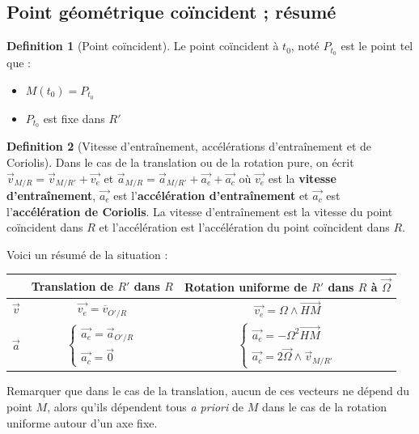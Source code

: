 \documentclass[french]{book}
\theoremstyle{plain}
\theoremstyle{definition}
\newtheorem{dfn}{Definition}
\theoremstyle{remark}
\begin{document}
\subsection{Point géométrique coïncident ; résumé}
\begin{dfn}[Point coïncident]
	Le point coïncident à $t_0$, noté $P_{t_0}$ est le point tel que : \begin{itemize}
		\item $M(t_0)=P_{t_0}$
		\item $P_{t_0}$ est fixe dans $R'$
	\end{itemize}
\end{dfn}
\begin{dfn}[Vitesse d'entraînement, accélérations d'entraînement et de Coriolis]
	Dans le cas de la translation ou de la rotation pure, on écrit $\overrightarrow{v}_{M/R}=\overrightarrow{v}_{M/R'}+\overrightarrow{v_e}$ et $\overrightarrow{a}_{M/R}=\overrightarrow{a}_{M/R'}+\overrightarrow{a_e}+\overrightarrow{a_c}$ où $\overrightarrow{v_e}$ est la \textbf{vitesse d'entraînement}, $\overrightarrow{a_e}$ est l'\textbf{accélération d'entraînement} et $\overrightarrow{a_c}$ est l'\textbf{accélération de Coriolis}. La vitesse d'entraînement est la vitesse du point coïncident dans $R$ et l'accélération est l'accélération du point coïncident dans $R$.
\end{dfn}
Voici un résumé de la situation : 
\begin{center}
	\begin{tabular}{|c|c|c|}
		\hline
		&Translation de $R'$ dans $R$&Rotation uniforme de $R'$ dans $R$ à $\overrightarrow{\Omega}$ \\[3mm]
		\hline
		$\overrightarrow{v}$&$\overrightarrow{v_e}=\overline{v}_{O'/R}$&$\overrightarrow{v_e}=\Omega\wedge\overrightarrow{HM}$ \\[3mm]
		\hline
		$\overrightarrow{a}$&$\begin{cases}
			\overrightarrow{a_e}=\overrightarrow{a}_{O'/R} \\
			\overrightarrow{a_c}=\overrightarrow{0}
		\end{cases}$ &$\begin{cases}
		\overrightarrow{a_e}=-\Omega^2\overrightarrow{HM} \\
		\overrightarrow{a_c}=2\overrightarrow{\Omega}\wedge\overrightarrow{v}_{M/R'}
		\end{cases}$ \\
		\hline
	\end{tabular}
\end{center}
Remarquer que dans le cas de la translation, aucun de ces vecteurs ne dépend du point $M$, alors qu'ils dépendent tous \textit{a priori} de $M$ dans le cas de la rotation uniforme autour d'un axe fixe.
\end{document}

